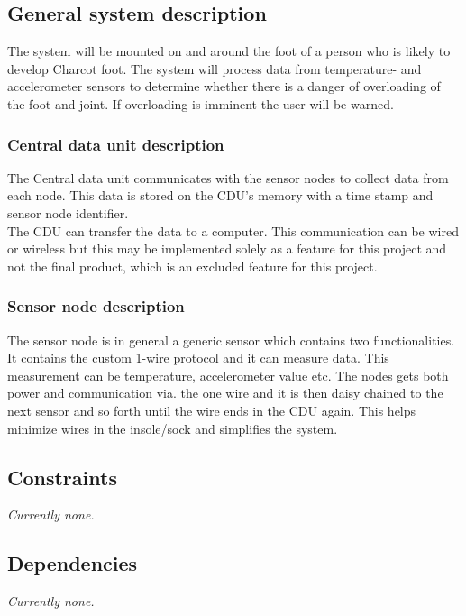 \subsection{General system description}
The system will be mounted on and around the foot of a person who is likely to develop Charcot foot. The system will process data from temperature- and accelerometer sensors to determine whether there is a danger of overloading of the foot and joint. If overloading is imminent the user will be warned.

\subsubsection{Central data unit description}
The Central data unit communicates with the sensor nodes to collect data from each node. This data is stored on the CDU's memory with a time stamp and sensor node identifier.\\
The CDU can transfer the data to a computer. This communication can be wired or wireless but this may be implemented solely as a feature for this project and not the final product, which is an excluded feature for this project.

\subsubsection{Sensor node description}
The sensor node is in general a generic sensor which contains two functionalities. It contains the custom 1-wire protocol and it can measure data. This measurement can be temperature, accelerometer value etc. The nodes gets both power and communication via. the one wire and it is then daisy chained to the next sensor and so forth until the wire ends in the CDU again. This helps minimize wires in the insole/sock and simplifies the system. 

\subsection{Constraints}
\textit{Currently none.}
\subsection{Dependencies}
\textit{Currently none.}


